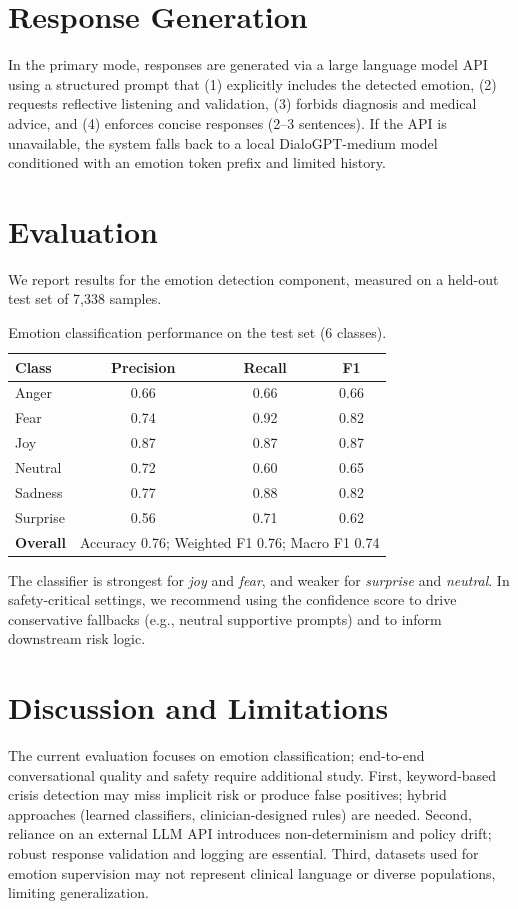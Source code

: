 \documentclass[conference]{IEEEtran}
\begin{document}
\section{Response Generation}
In the primary mode, responses are generated via a large language model API using a structured prompt that (1) explicitly includes the detected emotion, (2) requests reflective listening and validation, (3) forbids diagnosis and medical advice, and (4) enforces concise responses (2--3 sentences). If the API is unavailable, the system falls back to a local DialoGPT-medium model conditioned with an emotion token prefix and limited history.

\section{Evaluation}
We report results for the emotion detection component, measured on a held-out test set of 7{,}338 samples.

\begin{table}[t]
  \caption{Emotion classification performance on the test set (6 classes).}
  \label{tab:emotion-metrics}
  \centering
  \begin{tabular}{lccc}
    \toprule
    \textbf{Class} & \textbf{Precision} & \textbf{Recall} & \textbf{F1} \\
    \midrule
    Anger    & 0.66 & 0.66 & 0.66 \\
    Fear     & 0.74 & 0.92 & 0.82 \\
    Joy      & 0.87 & 0.87 & 0.87 \\
    Neutral  & 0.72 & 0.60 & 0.65 \\
    Sadness  & 0.77 & 0.88 & 0.82 \\
    Surprise & 0.56 & 0.71 & 0.62 \\
    \midrule
    \textbf{Overall} & \multicolumn{3}{c}{Accuracy 0.76; Weighted F1 0.76; Macro F1 0.74} \\
    \bottomrule
  \end{tabular}
\end{table}

The classifier is strongest for \emph{joy} and \emph{fear}, and weaker for \emph{surprise} and \emph{neutral}. In safety-critical settings, we recommend using the confidence score to drive conservative fallbacks (e.g., neutral supportive prompts) and to inform downstream risk logic.

\section{Discussion and Limitations}
The current evaluation focuses on emotion classification; end-to-end conversational quality and safety require additional study. First, keyword-based crisis detection may miss implicit risk or produce false positives; hybrid approaches (learned classifiers, clinician-designed rules) are needed. Second, reliance on an external LLM API introduces non-determinism and policy drift; robust response validation and logging are essential. Third, datasets used for emotion supervision may not represent clinical language or diverse populations, limiting generalization.
\end{document}
